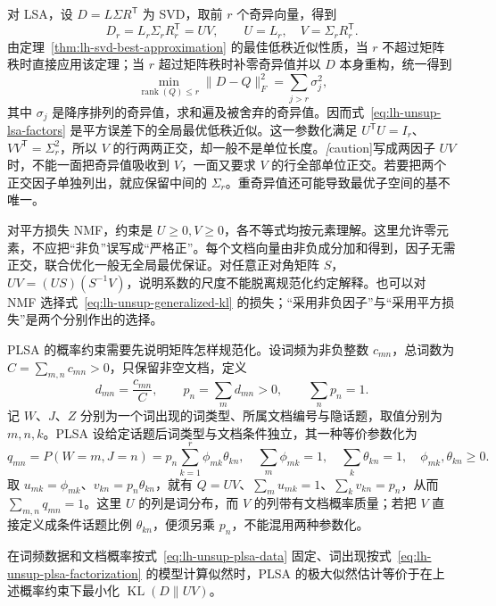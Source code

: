 对 LSA，设 $D=L\Sigma R^{\mathsf T}$ 为 SVD，取前 $r$ 个奇异向量，得到
\begin{equation}
\label{eq:lh-unsup-lsa-factors}
    D_r=L_r\Sigma_rR_r^{\mathsf T}=UV,\qquad
    U=L_r,\quad V=\Sigma_rR_r^{\mathsf T}.
\end{equation}
由定理~\ref{thm:lh-svd-best-approximation} 的最佳低秩近似性质，当 $r$ 不超过矩阵秩时直接应用该定理；当 $r$ 超过矩阵秩时补零奇异值并以 $D$ 本身重构，统一得到
\[
    \min_{\operatorname{rank}(Q)\leq r}\|D-Q\|_F^2
    =\sum_{j>r}\sigma_j^2,
\]
其中 $\sigma_j$ 是降序排列的奇异值，求和遍及被舍弃的奇异值。因而式~\eqref{eq:lh-unsup-lsa-factors} 是平方误差下的全局最优低秩近似。这一参数化满足 $U^{\mathsf T}U=I_r$、$VV^{\mathsf T}=\Sigma_r^2$，所以 $V$ 的行两两正交，却一般不是单位长度。\emph[caution]{写成两因子 $UV$ 时，不能一面把奇异值吸收到 $V$，一面又要求 $V$ 的行全部单位正交}。若要把两个正交因子单独列出，就应保留中间的 $\Sigma_r$。重奇异值还可能导致最优子空间的基不唯一。

对平方损失 NMF，约束是 $U\geq0,V\geq0$，各不等式均按元素理解。这里允许零元素，不应把“非负”误写成“严格正”。每个文档向量由非负成分加和得到，因子无需正交，联合优化一般无全局最优保证。对任意正对角矩阵 $S$，$UV=(US)(S^{-1}V)$，说明系数的尺度不能脱离规范化约定解释。也可以对 NMF 选择式~\eqref{eq:lh-unsup-generalized-kl} 的损失；“采用非负因子”与“采用平方损失”是两个分别作出的选择。

PLSA 的概率约束需要先说明矩阵怎样规范化。设词频为非负整数 $c_{mn}$，总词数为 $C=\sum_{m,n}c_{mn}>0$，只保留非空文档，定义
\begin{equation}
\label{eq:lh-unsup-plsa-data}
    d_{mn}=\frac{c_{mn}}C,\qquad p_n=\sum_m d_{mn}>0,
    \qquad\sum_n p_n=1.
\end{equation}
记 $W$、$J$、$Z$ 分别为一个词出现的词类型、所属文档编号与隐话题，取值分别为 $m,n,k$。PLSA 设给定话题后词类型与文档条件独立，其一种等价参数化为
\begin{equation}
\label{eq:lh-unsup-plsa-factorization}
    q_{mn}=P(W=m,J=n)=p_n\sum_{k=1}^{r}\phi_{mk}\theta_{kn},
    \quad \sum_m\phi_{mk}=1,\quad\sum_k\theta_{kn}=1,
    \quad\phi_{mk},\theta_{kn}\geq0.
\end{equation}
取 $u_{mk}=\phi_{mk}$、$v_{kn}=p_n\theta_{kn}$，就有 $Q=UV$、$\sum_m u_{mk}=1$、$\sum_k v_{kn}=p_n$，从而 $\sum_{m,n}q_{mn}=1$。这里 $U$ 的列是词分布，而 $V$ 的列带有文档概率质量；若把 $V$ 直接定义成条件话题比例 $\theta_{kn}$，便须另乘 $p_n$，不能混用两种参数化。

\begin{proposition}
\label{prop:lh-unsup-plsa-kl}
在词频数据和文档概率按式~\eqref{eq:lh-unsup-plsa-data} 固定、词出现按式~\eqref{eq:lh-unsup-plsa-factorization} 的模型计算似然时，PLSA 的极大似然估计等价于在上述概率约束下最小化 $\operatorname{KL}(D\|UV)$。
\end{proposition}

